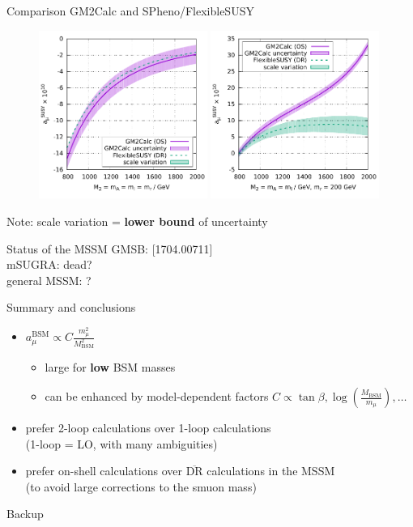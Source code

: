 \documentclass[hyperref={pdfpagelabels=false},ngerman]{beamer}
\renewcommand{\emph}{\textbf}
\newcommand{\DRbar}{\ensuremath{\overline{\text{DR}}}\xspace}
\begin{document}
\begin{frame}{Comparison GM2Calc and SPheno/FlexibleSUSY}
  \begin{figure}
    \centering
    \includegraphics[width=0.49\textwidth]{plots/OS-vs-DR}
    \includegraphics[width=0.49\textwidth]{plots/OS-vs-DR_splitting}
  \end{figure}
  Note: scale variation = \emph{lower bound} of uncertainty
\end{frame}

\begin{frame}{Status of the MSSM}
  GMSB: [1704.00711] \\
  mSUGRA: dead? \\
  general MSSM: ? \\
\end{frame}

\begin{frame}{Summary and conclusions}
  \begin{itemize}
  \item $a_\mu^\text{BSM} \propto C \frac{m_\mu^2}{M_\text{BSM}^2}$
    \begin{itemize}
    \item large for \emph{low} BSM masses
    \item can be enhanced by model-dependent factors $C \propto
      \tan\beta, \log(\frac{M_\text{BSM}}{m_\mu}), \ldots$
    \end{itemize}
  \item prefer 2-loop calculations over 1-loop calculations\\
    (1-loop = LO, with many ambiguities)
  \item prefer on-shell calculations over \DRbar calculations in the MSSM\\
    (to avoid large corrections to the smuon mass)
  \end{itemize}
\end{frame}


\begin{frame}[noframenumbering]
  \begin{center}
    \Huge Backup
  \end{center}
\end{frame}
\end{document}
